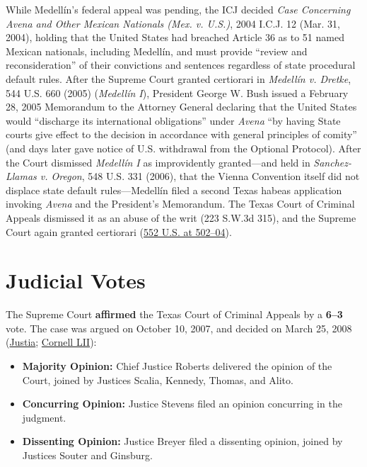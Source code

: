 \documentclass[12pt]{article}
\begin{document}
While Medell\'{i}n's federal appeal was pending, the ICJ decided \textit{Case Concerning Avena and Other Mexican Nationals (Mex. v. U.S.)}, 2004 I.C.J. 12 (Mar. 31, 2004), holding that the United States had breached Article 36 as to 51 named Mexican nationals, including Medell\'{i}n, and must provide ``review and reconsideration'' of their convictions and sentences regardless of state procedural default rules. After the Supreme Court granted certiorari in \textit{Medell\'{i}n v. Dretke}, 544 U.S. 660 (2005) (\textit{Medell\'{i}n I}), President George W. Bush issued a February 28, 2005 Memorandum to the Attorney General declaring that the United States would ``discharge its international obligations'' under \textit{Avena} ``by having State courts give effect to the decision in accordance with general principles of comity'' (and days later gave notice of U.S. withdrawal from the Optional Protocol). After the Court dismissed \textit{Medell\'{i}n I} as improvidently granted---and held in \textit{Sanchez-Llamas v. Oregon}, 548 U.S. 331 (2006), that the Vienna Convention itself did not displace state default rules---Medell\'{i}n filed a second Texas habeas application invoking \textit{Avena} and the President's Memorandum. The Texas Court of Criminal Appeals dismissed it as an abuse of the writ (223 S.W.3d 315), and the Supreme Court again granted certiorari (\href{https://www.law.cornell.edu/supct/html/06-984.ZS.html}{552 U.S. at 502--04}).

\section{Judicial Votes}
The Supreme Court \textbf{affirmed} the Texas Court of Criminal Appeals by a \textbf{6--3} vote. The case was argued on October 10, 2007, and decided on March 25, 2008 (\href{https://supreme.justia.com/cases/federal/us/552/491/}{Justia}; \href{https://www.law.cornell.edu/supct/html/06-984.ZS.html}{Cornell LII}):

\begin{itemize}
    \item \textbf{Majority Opinion:} Chief Justice Roberts delivered the opinion of the Court, joined by Justices Scalia, Kennedy, Thomas, and Alito.
    \item \textbf{Concurring Opinion:} Justice Stevens filed an opinion concurring in the judgment.
    \item \textbf{Dissenting Opinion:} Justice Breyer filed a dissenting opinion, joined by Justices Souter and Ginsburg.
\end{itemize}
\end{document}
